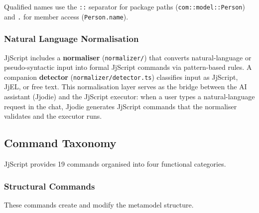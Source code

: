 \documentclass[11pt,a4paper]{article}
\newcommand{\jjscript}{\textsf{JjScript}}
\newcommand{\jjel}{\textsf{JjEL}}
\begin{document}
Qualified names use the \texttt{::} separator for package paths
(\texttt{com::model::Person}) and \texttt{.} for member access
(\texttt{Person.name}).

\subsubsection{Natural Language Normalisation}

\jjscript{} includes a \textbf{normaliser}
(\texttt{normalizer/}) that converts natural-language or
pseudo-syntactic input into formal \jjscript{} commands via
pattern-based rules. A companion \textbf{detector}
(\texttt{normalizer/detector.ts}) classifies input as \jjscript{},
\jjel{}, or free text.
This normalisation layer serves as the bridge between the AI assistant
(Jjodie) and the \jjscript{} executor: when a user types a natural-language
request in the chat, Jjodie generates \jjscript{} commands that the
normaliser validates and the executor runs.


\subsection{Command Taxonomy}\label{sec:jjscript-commands}

\jjscript{} provides 19 commands organised into four functional categories.

\subsubsection{Structural Commands}

These commands create and modify the metamodel structure.
\end{document}
